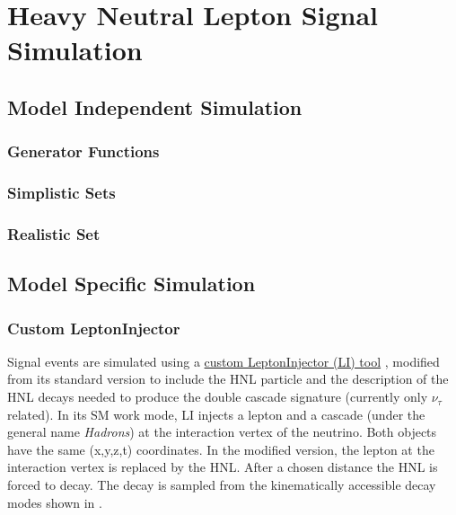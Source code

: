 \setchapterpreamble[u]{\margintoc}

\chapter{Heavy Neutral Lepton Signal Simulation}



\section{Model Independent Simulation}

\subsection{Generator Functions}

\subsection{Simplistic Sets}

\subsection{Realistic Set}




\section{Model Specific Simulation}


\subsection{Custom LeptonInjector} 

Signal events are simulated using a \href{https://github.com/LeanderFischer/LeptonInjector-HNL/tree/main/LeptonInjector}{custom LeptonInjector (LI) tool} , modified from its standard version to include the HNL particle and the description of the HNL decays needed to produce the double cascade signature (currently only $\nu_{\tau}$ related). In its SM work mode, LI injects a lepton and a cascade (under the general name \textit{Hadrons}) at the interaction vertex of the neutrino. Both objects have the same (x,y,z,t) coordinates. In the modified version, the lepton at the interaction vertex is replaced by the HNL. After a chosen distance the HNL is forced to decay. The decay is sampled from the kinematically accessible decay modes shown in .

